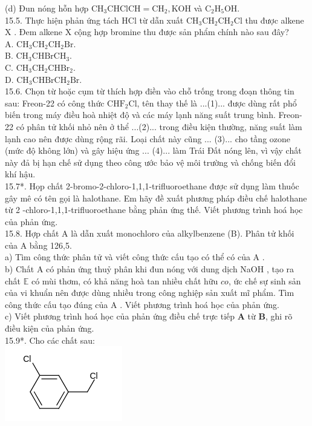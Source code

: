 \documentclass[10pt]{article}
\begin{document}
(d) Đun nóng hỗn hợp $\mathrm{CH}_{3} \mathrm{CHClCH}=\mathrm{CH}_{2}, \mathrm{KOH}$ và $\mathrm{C}_{2} \mathrm{H}_{5} \mathrm{OH}$.\\
15.5. Thực hiện phản ứng tách HCl từ dẫn xuất $\mathrm{CH}_{3} \mathrm{CH}_{2} \mathrm{CH}_{2} \mathrm{Cl}$ thu được alkene X . Đem alkene X cộng hợp bromine thu được sản phẩm chính nào sau đây?\\
A. $\mathrm{CH}_{3} \mathrm{CH}_{2} \mathrm{CH}_{2} \mathrm{Br}$.\\
B. $\mathrm{CH}_{3} \mathrm{CHBrCH}_{3}$.\\
C. $\mathrm{CH}_{3} \mathrm{CH}_{2} \mathrm{CHBr}_{2}$.\\
D. $\mathrm{CH}_{3} \mathrm{CHBrCH}_{2} \mathrm{Br}$.\\
15.6. Chọn từ hoặc cụm từ thích hợp điền vào chỗ trống trong đoạn thông tin sau: Freon-22 có công thức $\mathrm{CHF}_{2} \mathrm{Cl}$, tên thay thế là ...(1)... được dùng rất phổ biến trong máy điều hoà nhiệt độ và các máy lạnh năng suất trung bình. Freon-22 có phân tử khối nhỏ nên ở thể ...(2)... trong điều kiện thường, năng suất làm lạnh cao nên được dùng rộng rãi. Loại chất này cũng ... (3)... cho tầng ozone (mức độ không lớn) và gây hiệu ứng ... (4)... làm Trái Đất nóng lên, vì vậy chất này đả bị hạn chế sử dụng theo công ước bảo vệ môi trường và chống biến đổi khí hậu.\\
15.7*. Họp chất 2-bromo-2-chloro-1,1,1-trifluoroethane được sử dụng làm thuốc gây mê có tên gọi là halothane. Em hãy đề xuất phương pháp điều chế halothane từ 2 -chloro-1,1,1-trifluoroethane bằng phản ứng thế. Viết phương trình hoá học của phản ứng.\\
15.8. Hợp chất A là dẫn xuất monochloro của alkylbenzene (B). Phân tử khối của A bằng 126,5.\\
a) Tìm công thức phân tử và viết công thức cấu tạo có thể có của A .\\
b) Chất A có phản ứng thuỷ phân khi đun nóng với dung dịch NaOH , tạo ra chất $\mathbb{E}$ có mùi thơm, có khả năng hoà tan nhiều chất hữu $c o$, ức chế sự sinh sản của vi khuẩn nên được dùng nhiều trong công nghiệp sản xuất mĩ phẩm. Tìm công thức cấu tạo đúng của A . Viết phương trình hoá học của phản ứng.\\
c) Viết phương trình hoá học của phản ứng điều chế trực tiếp $\mathbf{A}$ từ $\mathbf{B}$, ghi rõ điều kiện của phản ứng.\\
15.9*. Cho các chất sau:\\
\includegraphics{smile-183e92496f965e49c6789810862e173953f05208}
\end{document}
